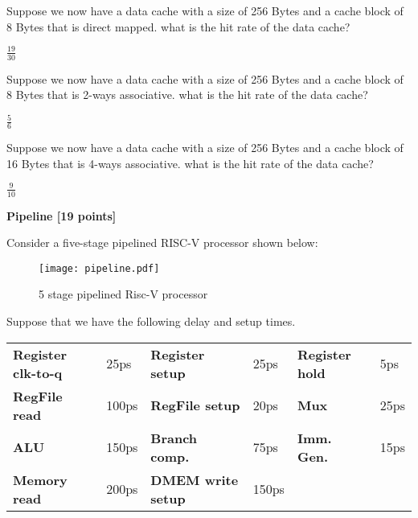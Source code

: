 \documentclass[addpoints, 12pt, answers]{exam}
\begin{document}
\begin{questions}
\begin{parts}
        Suppose we now have a data cache with a size of 256 Bytes and a cache block of 8 Bytes that is direct mapped. what is the hit rate of the data cache?


        \underline{$\frac{19}{30}$}

        Suppose we now have a data cache with a size of 256 Bytes and a cache block of 8 Bytes that is 2-ways associative. what is the hit rate of the data cache?


        \underline{$\frac{5}{6}$}


        Suppose we now have a data cache with a size of 256 Bytes and a cache block of 16 Bytes that is 4-ways associative. what is the hit rate of the data cache?

        \underline{$\frac{9}{10}$}




    \end{parts}

    \pagebreak


    \question \textbf{Pipeline [19 points]}

    Consider a five-stage pipelined RISC-V processor shown below:
    \begin{figure}[h]
        \centering
        \texttt{[image: pipeline.pdf]}
        \caption*{5 stage pipelined Risc-V processor}
        \label{fig:pipelined}
    \end{figure}

    Suppose that we have the following delay and setup times.

    \begin{table}[h]
        \centering
        \begin{tabular}{l l l l l l}
            {\bf Register clk-to-q} & 25ps  & {\bf Register setup}   & 25ps  & {\bf Register hold} & 5ps  \\
            {\bf RegFile read}      & 100ps & {\bf RegFile setup}    & 20ps  & {\bf Mux}           & 25ps \\
            {\bf ALU}               & 150ps & {\bf Branch comp.}     & 75ps  & {\bf Imm. Gen.}     & 15ps \\
            {\bf Memory read}       & 200ps & {\bf DMEM write setup} & 150ps                              \\
        \end{tabular}
        \label{tab:delay_time}
    \end{table}

    \begin{parts}

\end{parts}
\end{questions}
\end{document}
